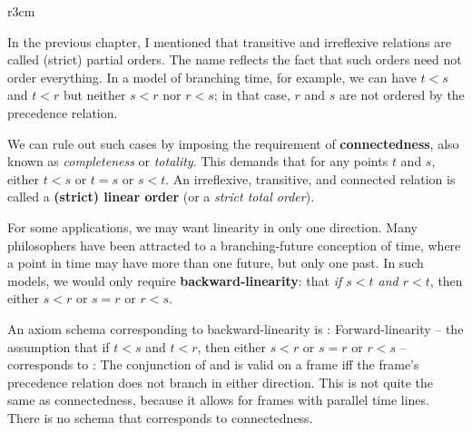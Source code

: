 \begin{wrapfigure}{r}{3cm}
  \quad
\end{wrapfigure}
In the previous chapter, I mentioned that transitive and irreflexive relations
are called (strict) partial orders. The name reflects the fact that such orders
need not order everything. In a model of branching time, for example, we can
have $t<s$ and $t<r$ but neither $s<r$ nor $r<s$; in that case, $r$ and $s$ are
not ordered by the precedence relation.

We can rule out such cases by imposing the requirement of
\textbf{connectedness}, also known as \emph{completeness} or \emph{totality}.
This demands that for any points $t$ and $s$, either $t < s$ or $t=s$ or
$s < t$.  An irreflexive, transitive, and connected relation is called a
\textbf{(strict) linear order} (or a \emph{strict total order}).

For some applications, we may want linearity in only one direction. Many
philosophers have been attracted to a branching-future conception of time,
where a point in time may have more than one future, but only one past. In
such models, we would only require \textbf{backward-linearity}: that \emph{if
  $s < t$ and $r < t$}, then either $s < r$ or $s=r$ or $r < s$.

An axiom schema corresponding to backward-linearity is :
%
%
Forward-linearity -- the assumption that if $t < s$ and $t < r$, then either
$s < r$ or $s=r$ or $r < s$ -- corresponds to :
%
%
%
The conjunction of  and  is valid on a frame iff the frame's
precedence relation does not branch in either direction. This is not quite the
same as connectedness, because it allows for frames with parallel time lines.
There is no schema that corresponds to connectedness.

